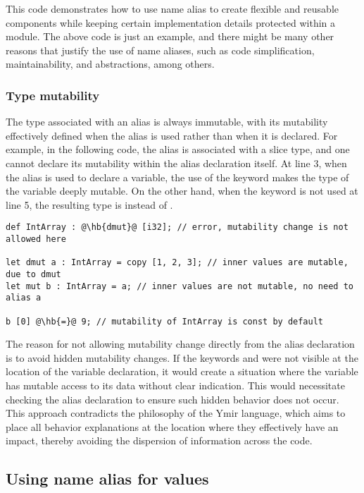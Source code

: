 This code demonstrates how to use name alias to create flexible and reusable
components while keeping certain implementation details protected within a
module. The above code is just an example, and there might be many other reasons
that justify the use of name aliases, such as code simplification,
maintainability, and abstractions, among others.

\subsubsection*{Type mutability}

The type associated with an alias is always immutable, with its mutability
effectively defined when the alias is used rather than when it is declared. For
example, in the following code, the alias  is associated with a
\token{[i32]} slice type, and one cannot declare its mutability within the alias
declaration itself. At line 3, when the alias  is used to
declare a variable, the use of the keyword  makes the type of the
variable deeply mutable. On the other hand, when the keyword  is not
used at line 5, the resulting type is  instead of .

\begin{lstlisting}[style=coloredverbatim, escapechar=@]
def IntArray : @\hb{dmut}@ [i32]; // error, mutability change is not allowed here

let dmut a : IntArray = copy [1, 2, 3]; // inner values are mutable, due to dmut
let mut b : IntArray = a; // inner values are not mutable, no need to alias a

b [0] @\hb{=}@ 9; // mutability of IntArray is const by default
\end{lstlisting}

The reason for not allowing mutability change directly from the alias
declaration is to avoid hidden mutability changes. If the keywords 
and  were not visible at the location of the variable declaration,
it would create a situation where the variable has mutable access to its data
without clear indication. This would necessitate checking the alias declaration
to ensure such hidden behavior does not occur. This approach contradicts the
philosophy of the Ymir language, which aims to place all behavior explanations
at the location where they effectively have an impact, thereby avoiding the
dispersion of information across the code.

\subsection{Using name alias for values}

